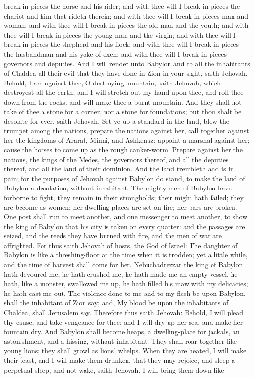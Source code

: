 break in pieces the horse and his rider; and with thee will I break in pieces the chariot and him that rideth therein; and with thee will I break in pieces man and woman; and with thee will I break in pieces the old man and the youth; and with thee will I break in pieces the young man and the virgin; and with thee will I break in pieces the shepherd and his flock; and with thee will I break in pieces the husbandman and his yoke of oxen; and with thee will I break in pieces governors and deputies. And I will render unto Babylon and to all the inhabitants of Chaldea all their evil that they have done in Zion in your sight, saith Jehovah.  Behold, I am against thee, O destroying mountain, saith Jehovah, which destroyest all the earth; and I will stretch out my hand upon thee, and roll thee down from the rocks, and will make thee a burnt mountain. And they shall not take of thee a stone for a corner, nor a stone for foundations; but thou shalt be desolate for ever, saith Jehovah.  Set ye up a standard in the land, blow the trumpet among the nations, prepare the nations against her, call together against her the kingdoms of Ararat, Minni, and Ashkenaz: appoint a marshal against her; cause the horses to come up as the rough canker-worm. Prepare against her the nations, the kings of the Medes, the governors thereof, and all the deputies thereof, and all the land of their dominion. And the land trembleth and is in pain; for the purposes of Jehovah against Babylon do stand, to make the land of Babylon a desolation, without inhabitant. The mighty men of Babylon have forborne to fight, they remain in their strongholds; their might hath failed; they are become as women: her dwelling-places are set on fire; her bars are broken. One post shall run to meet another, and one messenger to meet another, to show the king of Babylon that his city is taken on every quarter: and the passages are seized, and the reeds they have burned with fire, and the men of war are affrighted.  For thus saith Jehovah of hosts, the God of Israel: The daughter of Babylon is like a threshing-floor at the time when it is trodden; yet a little while, and the time of harvest shall come for her. Nebuchadrezzar the king of Babylon hath devoured me, he hath crushed me, he hath made me an empty vessel, he hath, like a monster, swallowed me up, he hath filled his maw with my delicacies; he hath cast me out. The violence done to me and to my flesh be upon Babylon, shall the inhabitant of Zion say; and, My blood be upon the inhabitants of Chaldea, shall Jerusalem say. Therefore thus saith Jehovah: Behold, I will plead thy cause, and take vengeance for thee; and I will dry up her sea, and make her fountain dry. And Babylon shall become heaps, a dwelling-place for jackals, an astonishment, and a hissing, without inhabitant. They shall roar together like young lions; they shall growl as lions’ whelps. When they are heated, I will make their feast, and I will make them drunken, that they may rejoice, and sleep a perpetual sleep, and not wake, saith Jehovah. I will bring them down like 